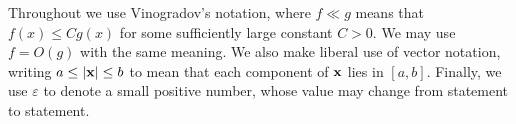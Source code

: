 \documentclass{amsart}%
\numberwithin{equation}{section}
\newtheorem{theorem}{Theorem}[section]
\theoremstyle{remark}
\newcommand{\bx}{{\bf x}}
\newcommand{\R}{\mathbb{R}}
\newcommand{\1}{\mathbbm{1}}
\begin{document}


Throughout we use Vinogradov's notation, where $f\ll g$ means that $f(x)\leq Cg(x)$ for some sufficiently large constant $C>0.$ We may use $f=O(g)$ with the same meaning. We also make liberal use of vector notation, writing $a \le |\bx| \le b$ to mean that each component of $\bx$ lies in $[a,b]$. Finally, we use $\varepsilon$ to denote a small positive number, whose value may change from statement to statement.






\end{document}
